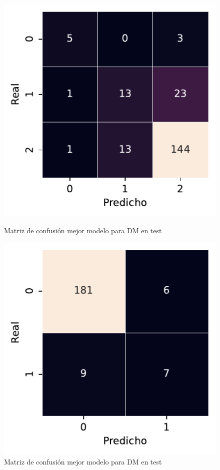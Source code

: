 \begin{figure}[htbp]
    \vspace{1.5em} %

    \includegraphics[width=0.5\linewidth]{figures/5_experiments/multi-dm-cm.pdf}
    \caption{Matriz de confusión mejor modelo para DM en test}
    \label{fig5:DM_confusion_matrix}
    \includegraphics[width=0.5\linewidth]{figures/5_experiments/multi-dp-cm.pdf}
    \caption{Matriz de confusión mejor modelo para DM en test}
    \label{fig5:DP_confusion_matrix}
\end{figure}


